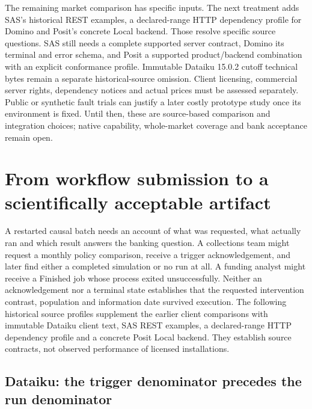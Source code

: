 The remaining market comparison has specific inputs. The next treatment adds SAS's historical REST examples, a declared-range HTTP dependency profile for Domino and Posit's concrete Local backend. Those resolve specific source questions. SAS still needs a complete supported server contract, Domino its terminal and error schema, and Posit a supported product/backend combination with an explicit conformance profile. Immutable Dataiku 15.0.2 cutoff technical bytes remain a
separate historical-source omission. Client licensing, commercial server
rights, dependency notices and actual prices must be assessed separately.
Public or synthetic fault trials can justify a later costly prototype study
once its environment is fixed. Until then, these are source-based comparison
and integration choices; native capability, whole-market coverage and bank
acceptance remain open.


\section{From workflow submission to a scientifically acceptable artifact}
\label{sec:exec24-workflow-contracts}

A restarted causal batch needs an account of what was requested, what
actually ran and which result answers the banking question. A collections
team might request a monthly policy comparison, receive a trigger
acknowledgement, and later find either a completed simulation or no run at
all. A funding analyst might receive a Finished job whose process exited
unsuccessfully. Neither an acknowledgement nor a terminal state establishes
that the requested intervention contrast, population and information date
survived execution. The following historical source profiles supplement the
earlier client comparisons with immutable Dataiku client text, SAS REST
examples, a declared-range HTTP dependency profile and a concrete Posit
Local backend. They establish source contracts, not observed performance of
licensed installations.~\citep{exec24_workflow_contracts_dataiku,
exec24_workflow_contracts_sas,exec24_workflow_contracts_domino,
exec24_workflow_contracts_posit}

\subsection{Dataiku: the trigger denominator precedes the run denominator}

